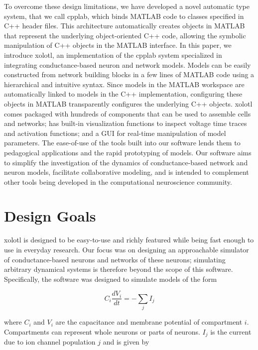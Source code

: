 \documentclass{frontiersSCNS} %
\begin{document}
To overcome these design limitations, we have developed a novel automatic type system, that we call cpplab, which binds MATLAB code to classes specified in C++ header files. This architecture automatically creates objects in MATLAB that represent the underlying object-oriented C++ code, allowing the symbolic manipulation of C++ objects in the MATLAB interface. In this paper, we introduce xolotl, an implementation of the cpplab system specialized in integrating conductance-based neuron and network models. Models can be easily constructed from network building blocks in a few lines of MATLAB code using a hierarchical and intuitive syntax. Since models in the MATLAB workspace are automatically linked to models in the C++ implementation, configuring these objects in MATLAB transparently configures the underlying C++ objects. xolotl comes packaged with hundreds of components that can be used to assemble cells and networks;  has built-in visualization functions to inspect voltage time traces and activation functions; and a GUI for real-time manipulation of model parameters. The ease-of-use of the tools built into our software lends them to pedagogical applications and the rapid prototyping of models. Our software aims to simplify the investigation of the dynamics of conductance-based network and neuron models, facilitate collaborative modeling, and is intended to complement other tools being developed in the computational neuroscience community.


%
%
%
%
%
%

\section{Design Goals}
\label{design}

xolotl is designed to be easy-to-use and richly featured while being fast enough to use in everyday research. Our focus was on designing an approachable simulator of conductance-based neurons and networks of these neurons; simulating arbitrary dynamical systems is therefore beyond the scope of this software. Specifically, the software was designed to simulate models of the form


\begin{equation}
C_{i}\frac{dV_{i}}{dt}=-\sum_{j}I_{j} \label{eq:1}
\end{equation}

where \( C_{i} \) and  \( V_{i} \) are the capacitance and membrane potential of compartment  \( i \). Compartments can represent whole neurons or parts of neurons.  \( I_{j} \) is the current due to ion channel population \( j \) and is given by
\end{document}
